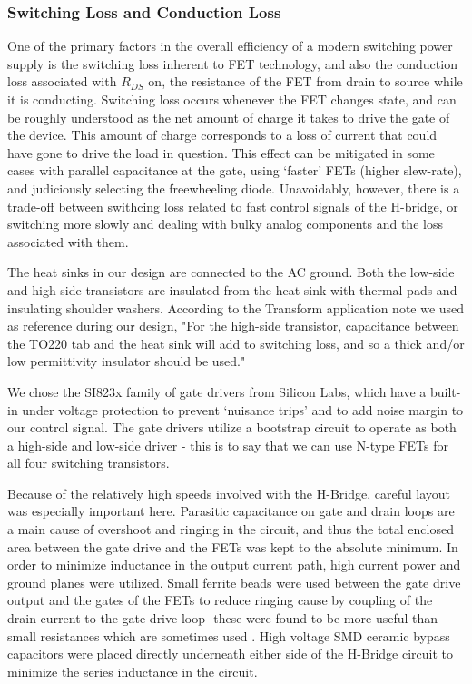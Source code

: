\subsubsection{Switching Loss and Conduction Loss}
One of the primary factors in the overall efficiency of a modern switching power supply is the switching loss inherent to FET technology, and also the conduction loss associated with $R_{DS}$ on, the resistance of the FET from drain to source while it is conducting. Switching loss occurs whenever the FET changes state, and can be roughly understood as the net amount of charge it takes to drive the gate of the device. This amount of charge corresponds to a loss of current that could have gone to drive the load in question. This effect can be mitigated in some cases with parallel capacitance at the gate, using `faster' FETs (higher slew-rate), and judiciously selecting the freewheeling diode\cite{switchingLoss}. Unavoidably, however, there is a trade-off between swithcing loss related to fast control signals of the H-bridge, or switching more slowly and dealing with bulky analog components and the loss associated with them. 

The heat sinks in our design are connected to the AC ground. Both the low-side and high-side transistors are insulated from the heat sink with thermal pads and insulating shoulder washers. According to the Transform application note we used as reference during our design, "For the high-side transistor, capacitance between the TO220 tab and the heat sink will add to switching loss, and so a thick and/or low permittivity insulator should be used."\cite{transphorm}

We chose the SI823x family of gate drivers from Silicon Labs, which have a built-in under voltage protection to prevent `nuisance trips' and to add noise margin to our control signal. The gate drivers utilize a bootstrap circuit to operate as both a high-side and low-side driver - this is to say that we can use N-type FETs for all four switching transistors. 

Because of the relatively high speeds involved with the H-Bridge, careful layout was especially important here. Parasitic capacitance on gate and drain loops are a main cause of overshoot and ringing in the circuit, and thus the total enclosed area between the gate drive and the FETs was kept to the absolute minimum. In order to minimize inductance in the output current path, high current power and ground planes were utilized. Small ferrite beads were used between the gate drive output and the gates of the FETs to reduce ringing cause by coupling of the drain current to the gate drive loop- these were found to be more useful than small resistances which are sometimes used \cite{transphorm}. High voltage SMD ceramic bypass capacitors were placed directly underneath either side of the H-Bridge circuit to minimize the series inductance in the circuit. 
  
